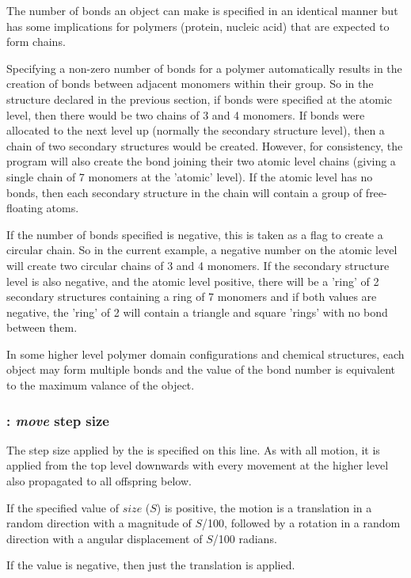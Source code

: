 The number of bonds an object can make is specified in an identical manner but has some
implications for polymers (protein, nucleic acid) that are expected to form chains.

Specifying a non-zero number of bonds for a polymer automatically results in the creation
of bonds between adjacent monomers within their group. 
So in the  structure declared in the previous section, if bonds
were specified at the atomic level, then there would be two chains of 3 and 4 monomers.
If bonds were allocated to the next level up (normally the secondary structure level), then
a chain of two secondary structures would be created.  However, for consistency, the
program will also create the bond joining their two atomic level chains (giving a single
chain of 7 monomers at the 'atomic' level).  If the atomic level has no bonds, then each
secondary structure in the chain will contain a group of free-floating atoms.

If the number of bonds specified is negative, this is taken as a flag to create a circular
chain.  So in the current example, a negative number on the atomic level will create two
circular chains of 3 and 4 monomers.   If the secondary structure level is also negative,
and the atomic level positive, there will be a 'ring' of 2 secondary structures containing 
a ring of 7 monomers and if both values are negative, the 'ring' of 2 will contain a
triangle and square 'rings' with no bond between them.

In some higher level polymer domain configurations and chemical structures, each object
may form multiple bonds and the value of the bond number is equivalent to the maximum
valance of the object.  

\subsubsection{: {\em move} step size}

The step size applied by the  is specified on this line.   As with all motion,
it is applied from the top level downwards with every movement at the higher level also
propagated to all offspring below.

If the specified value of $size$ ($S$) is positive, the motion is a translation in a random direction
with a magnitude of $S$/100, followed by a rotation in a random direction with a angular
displacement of $S$/100 radians.

If the value is negative, then just the translation is applied.

